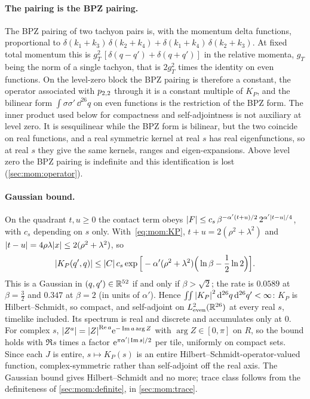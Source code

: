 \paragraph{The pairing is the BPZ pairing.}
The BPZ pairing of two tachyon pairs is, with the momentum delta functions, proportional to $\delta(k_1 + k_3) \, \delta(k_2 + k_4) + \delta(k_1 + k_4) \, \delta(k_2 + k_3)$.
At fixed total momentum this is $g_T^2 \, [\delta(q - q') + \delta(q + q')]$ in the relative momenta, $g_T$ being the norm of a single tachyon, that is $2 g_T^2$ times the identity on even functions.
On the level-zero block the BPZ pairing is therefore a constant, the operator associated with $p_{2,2}$ through it is a constant multiple of $K_P$, and the bilinear form $\int \sigma \sigma' \, \dd^{26} q$ on even functions is the restriction of the BPZ form.
The inner product used below for compactness and self-adjointness is not auxiliary at level zero.
It is sesquilinear while the BPZ form is bilinear, but the two coincide on real functions, and a real symmetric kernel at real $s$ has real eigenfunctions, so at real $s$ they give the same kernels, ranges and eigen-expansions.
Above level zero the BPZ pairing is indefinite and this identification is lost (\cref{sec:mom:operator}).

\paragraph{Gaussian bound.}
On the quadrant $t, u \ge 0$ the contact term obeys ${|F|} \le c_s \, \beta^{- \alpha' (t + u) / 2} \, 2^{\alpha' {|t - u|} / 4}$, with $c_s$ depending on $s$ only.
With~\eqref{eq:mom:KP}, $t + u = 2 (\rho^2 + \lambda^2)$ and ${|t - u|} = 4 \rho \lambda {|x|} \le 2 (\rho^2 + \lambda^2)$, so
\begin{equation}
  \label{eq:mom:gaussian-bound}
  {|K_P(q', q)|}
    \le {|C|} \, c_s \exp\Big[ - \alpha' (\rho^2 + \lambda^2) \Big( \ln \beta - \frac{1}{2} \ln 2 \Big) \Big].
\end{equation}
This is a Gaussian in $(q, q') \in \mathbb{R}^{52}$ if and only if $\beta > \sqrt{2}$; the rate is $0.0589$ at $\beta = \tfrac{3}{2}$ and $0.347$ at $\beta = 2$ (in units of $\alpha'$).
Hence $\iint {|K_P|}^2 \, \mathrm{d}^{26} q \, \mathrm{d}^{26} q' < \infty$: $K_P$ is Hilbert--Schmidt, so compact, and self-adjoint on $L^2_{\rm even}(\mathbb{R}^{26})$ at every real $s$, timelike included.
Its spectrum is real and discrete and accumulates only at $0$.
For complex $s$, ${|Z^{a}|} = {|Z|}^{\operatorname{Re} a} \mathrm{e}^{- \operatorname{Im} a \arg Z}$ with $\arg Z \in [0, \pi]$ on $R$, so the bound holds with $\Re s$ times a factor $\mathrm{e}^{\pi \alpha' {|\operatorname{Im} s|} / 2}$ per tile, uniformly on compact sets.
Since each $J$ is entire, $s \mapsto K_P(s)$ is an entire Hilbert--Schmidt-operator-valued function, complex-symmetric rather than self-adjoint off the real axis.
The Gaussian bound gives Hilbert--Schmidt and no more; trace class follows from the definiteness of \cref{sec:mom:definite}, in \cref{sec:mom:trace}.

